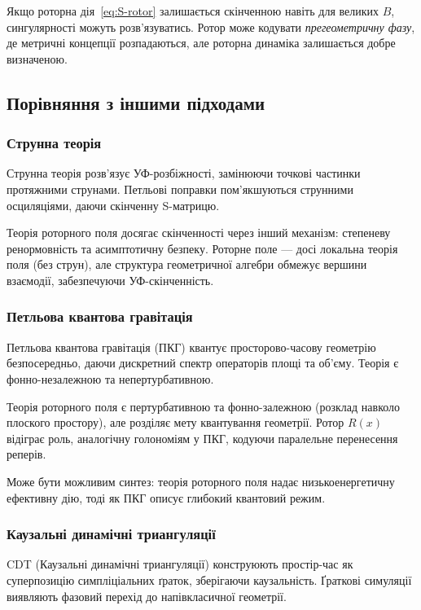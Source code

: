 \documentclass[11pt,a4paper]{article}
\numberwithin{equation}{section}
\theoremstyle{plain}
\theoremstyle{definition}
\theoremstyle{remark}
\begin{document}
Якщо роторна дія~\eqref{eq:S-rotor} залишається скінченною навіть для великих $B$, сингулярності можуть розв'язуватись. Ротор може кодувати \emph{прегеометричну фазу}, де метричні концепції розпадаються, але роторна динаміка залишається добре визначеною.

\subsection{Порівняння з іншими підходами}

\subsubsection{Струнна теорія}

Струнна теорія розв'язує УФ-розбіжності, замінюючи точкові частинки протяжними струнами. Петльові поправки пом'якшуються струнними осциляціями, даючи скінченну S-матрицю.

Теорія роторного поля досягає скінченності через інший механізм: степеневу ренормовність та асимптотичну безпеку. Роторне поле — досі локальна теорія поля (без струн), але структура геометричної алгебри обмежує вершини взаємодії, забезпечуючи УФ-скінченність.

\subsubsection{Петльова квантова гравітація}

Петльова квантова гравітація (ПКГ) квантує просторово-часову геометрію безпосередньо, даючи дискретний спектр операторів площі та об'єму. Теорія є фонно-незалежною та непертурбативною.

Теорія роторного поля є пертурбативною та фонно-залежною (розклад навколо плоского простору), але розділяє мету квантування геометрії. Ротор $R(x)$ відіграє роль, аналогічну голономіям у ПКГ, кодуючи паралельне перенесення реперів.

Може бути можливим синтез: теорія роторного поля надає низькоенергетичну ефективну дію, тоді як ПКГ описує глибокий квантовий режим.

\subsubsection{Каузальні динамічні триангуляції}

CDT (Каузальні динамічні триангуляції) конструюють простір-час як суперпозицію симпліціальних ґраток, зберігаючи каузальність. Ґраткові симуляції виявляють фазовий перехід до напівкласичної геометрії.
\end{document}
